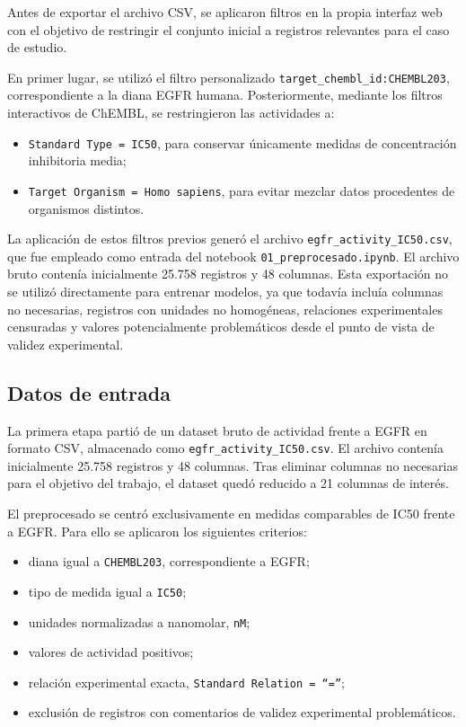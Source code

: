 \documentclass[IB]{TFUOC}%
\begin{document}
Antes de exportar el archivo CSV, se aplicaron filtros en la propia interfaz web con el objetivo de restringir el conjunto inicial a registros relevantes para el caso de estudio.

En primer lugar, se utilizó el filtro personalizado \texttt{target\_chembl\_id:CHEMBL203}, correspondiente a la diana EGFR humana. Posteriormente, mediante los filtros interactivos de ChEMBL, se restringieron las actividades a:

\begin{itemize}
    \item \texttt{Standard Type = IC50}, para conservar únicamente medidas de concentración inhibitoria media;
    \item \texttt{Target Organism = Homo sapiens}, para evitar mezclar datos procedentes de organismos distintos.
\end{itemize}

La aplicación de estos filtros previos generó el archivo \texttt{egfr\_activity\_IC50.csv}, que fue empleado como entrada del notebook \texttt{01\_preprocesado.ipynb}. El archivo bruto contenía inicialmente 25.758 registros y 48 columnas. Esta exportación no se utilizó directamente para entrenar modelos, ya que todavía incluía columnas no necesarias, registros con unidades no homogéneas, relaciones experimentales censuradas y valores potencialmente problemáticos desde el punto de vista de validez experimental.

\subsection{Datos de entrada}

La primera etapa partió de un dataset bruto de actividad frente a EGFR en formato CSV, almacenado como \texttt{egfr\_activity\_IC50.csv}. El archivo contenía inicialmente 25.758 registros y 48 columnas. Tras eliminar columnas no necesarias para el objetivo del trabajo, el dataset quedó reducido a 21 columnas de interés.

El preprocesado se centró exclusivamente en medidas comparables de IC50 frente a EGFR. Para ello se aplicaron los siguientes criterios:

\begin{itemize}
    \item diana igual a \texttt{CHEMBL203}, correspondiente a EGFR;
    \item tipo de medida igual a \texttt{IC50};
    \item unidades normalizadas a nanomolar, \texttt{nM};
    \item valores de actividad positivos;
    \item relación experimental exacta, \texttt{Standard Relation = ``=''};
    \item exclusión de registros con comentarios de validez experimental problemáticos.
\end{itemize}
\end{document}
